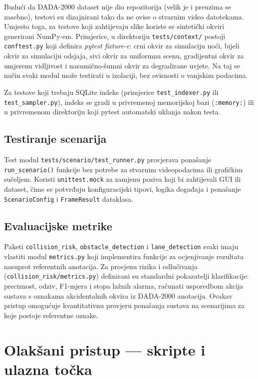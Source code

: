 Budući da DADA-2000 dataset nije dio repozitorija (velik je i preuzima se zasebno), testovi su dizajnirani tako da ne ovise o stvarnim video datotekama. Umjesto toga, za testove koji zahtijevaju slike koriste se sintetički okviri generirani NumPy-em. Primjerice, u direktoriju \texttt{tests/context/} postoji \texttt{conftest.py} koji definira \textit{pytest fixture-e}: crni okvir za simulaciju noći, bijeli okvir za simulaciju odsjaja, sivi okvir za uniformnu scenu, gradijentni okvir za umjerenu vidljivost i nasumično-šumni okvir za degradirane uvjete. Na taj se način svaki modul može testirati u izolaciji, bez ovisnosti o vanjskim podacima.

Za testove koji trebaju SQLite indeks (primjerice \texttt{test\_indexer.py} ili \texttt{test\_sampler.py}), indeks se gradi u privremenoj memorijskoj bazi (\texttt{:memory:}) ili u privremenom direktoriju koji pytest automatski uklanja nakon testa.

\subsection{Testiranje scenarija}

Test modul \texttt{tests/scenario/test\_runner.py} provjerava ponašanje \texttt{run\_scenario()} funkcije bez potrebe za stvarnim videopodacima ili grafičkim sučeljem. Koristi \texttt{unittest.mock} za zamjenu poziva koji bi zahtijevali GUI ili dataset, čime se potvrđuju konfiguracijski tipovi, logika događaja i ponašanje \texttt{ScenarioConfig} i \texttt{FrameResult} dataklasa.

\subsection{Evaluacijske metrike}

Paketi \texttt{collision\_risk}, \texttt{obstacle\_detection} i \texttt{lane\_detection} svaki imaju vlastiti modul \texttt{metrics.py} koji implementira funkcije za ocjenjivanje rezultata nasuprot referentnih anotacija. Za procjenu rizika i odlučivanja (\texttt{collision\_risk/metrics.py}) definirani su standardni pokazatelji klasifikacije: preciznost, odziv, F1-mjera i stopa lažnih alarma, računati usporedbom akcija sustava s oznakama akcidentalnih okvira iz DADA-2000 anotacija. Ovakav pristup omogućuje kvantitativnu provjeru ponašanja sustava na scenarijima za koje postoje referentne oznake.

\section{Olakšani pristup --- skripte i ulazna točka}

